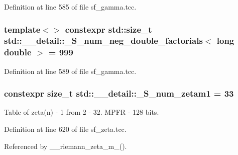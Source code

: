 Definition at line 585 of file sf\+\_\+gamma.\+tcc.

\subsubsection[{\texorpdfstring{\+\_\+\+S\+\_\+num\+\_\+neg\+\_\+double\+\_\+factorials$<$ long double $>$}{_S_num_neg_double_factorials< long double >}}]{\setlength{\rightskip}{0pt plus 5cm}template$<$$>$ constexpr std\+::size\+\_\+t {\bf std\+::\+\_\+\+\_\+detail\+::\+\_\+\+S\+\_\+num\+\_\+neg\+\_\+double\+\_\+factorials}$<$ long double $>$ = 999}\hypertarget{namespacestd_1_1____detail_a2ef051ec96e521e71489d2327d11c22a}{}\label{namespacestd_1_1____detail_a2ef051ec96e521e71489d2327d11c22a}


Definition at line 589 of file sf\+\_\+gamma.\+tcc.

\subsubsection[{\texorpdfstring{\+\_\+\+S\+\_\+num\+\_\+zetam1}{_S_num_zetam1}}]{\setlength{\rightskip}{0pt plus 5cm}constexpr size\+\_\+t std\+::\+\_\+\+\_\+detail\+::\+\_\+\+S\+\_\+num\+\_\+zetam1 = 33}\hypertarget{namespacestd_1_1____detail_a807e36c2aec3a9f27fdb21726cd464e2}{}\label{namespacestd_1_1____detail_a807e36c2aec3a9f27fdb21726cd464e2}
Table of zeta(n) -\/ 1 from 2 -\/ 32. M\+P\+FR -\/ 128 bits. 

Definition at line 620 of file sf\+\_\+zeta.\+tcc.



Referenced by \+\_\+\+\_\+riemann\+\_\+zeta\+\_\+m\+\_().

